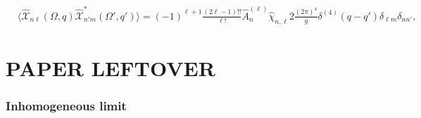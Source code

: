 \documentclass[aps,prd,preprint,nofootinbib,amsmath,amssymb,showpacs,longbibliography,singlecolumn,superscriptaddress,10pt]{revtex4-1}
\theoremstyle{plain}
\theoremstyle{definition}
\begin{document}
%
\begin{equation}
\label{eq:corr-X-components-apn}
\begin{aligned}
&
\langle \widehat{\mathcal{X}}_{n\ell}(\Omega, q) \widehat{\mathcal{X}}^{*}_{n'm}(\Omega', q') \rangle
=
(-1)^{\ell+1}\frac{(2 \ell - 1)!!}{\ell!}
\widehat{A}_{n}^{(\ell)} \widehat{\chi}_{n,\ell} 2 \frac{(2 \pi)^{4}}{g} \delta^{(4)}(q-q') \delta_{\ell m} \delta_{nn'},
\end{aligned}    
\end{equation}





\section{PAPER LEFTOVER}

\subsubsection{Inhomogeneous limit}
\end{document}
